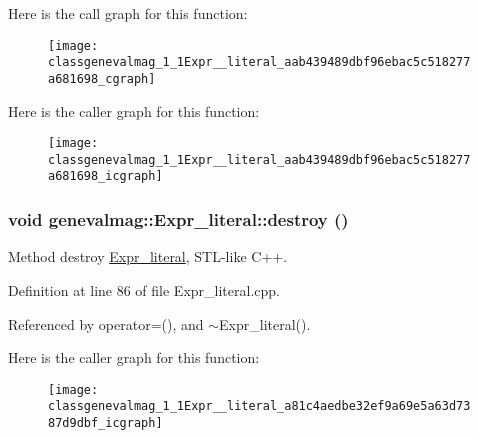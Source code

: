 Here is the call graph for this function:\nopagebreak
\begin{figure}[H]
\begin{center}
\leavevmode
\texttt{[image: classgenevalmag\_1\_1Expr\_\_literal\_aab439489dbf96ebac5c518277a681698\_cgraph]}
\end{center}
\end{figure}




Here is the caller graph for this function:\nopagebreak
\begin{figure}[H]
\begin{center}
\leavevmode
\texttt{[image: classgenevalmag\_1\_1Expr\_\_literal\_aab439489dbf96ebac5c518277a681698\_icgraph]}
\end{center}
\end{figure}


\hypertarget{classgenevalmag_1_1Expr__literal_a81c4aedbe32ef9a69e5a63d7387d9dbf}{
\subsubsection[{destroy}]{\setlength{\rightskip}{0pt plus 5cm}void genevalmag::Expr\_\-literal::destroy ()}}
\label{classgenevalmag_1_1Expr__literal_a81c4aedbe32ef9a69e5a63d7387d9dbf}
Method destroy \hyperlink{classgenevalmag_1_1Expr__literal}{Expr\_\-literal}, STL-\/like C++. 

Definition at line 86 of file Expr\_\-literal.cpp.



Referenced by operator=(), and $\sim$Expr\_\-literal().



Here is the caller graph for this function:\nopagebreak
\begin{figure}[H]
\begin{center}
\leavevmode
\texttt{[image: classgenevalmag\_1\_1Expr\_\_literal\_a81c4aedbe32ef9a69e5a63d7387d9dbf\_icgraph]}
\end{center}
\end{figure}


